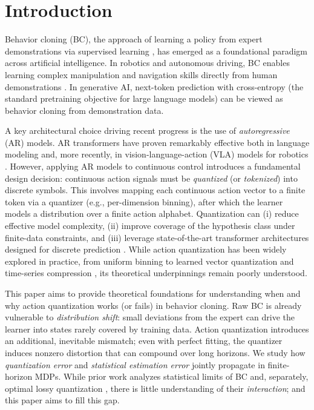 \documentclass{article}
\begin{document}
\section{Introduction}
Behavior cloning (BC), the approach of learning a policy from expert demonstrations via supervised learning \citep{pomerleau1988alvinn,bain1995framework}, has emerged as a foundational paradigm across artificial intelligence. In robotics and autonomous driving, BC enables learning complex manipulation and navigation skills directly from human demonstrations \citep{black2024pi_0}. In generative AI, next-token prediction with cross-entropy (the standard pretraining objective for large language models) can be viewed as behavior cloning from demonstration data.

A key architectural choice driving recent progress is the use of \emph{autoregressive} (AR) models. AR transformers have proven remarkably effective both in language modeling and, more recently, in vision-language-action (VLA) models for robotics \citep{brohan2022rt,chebotar2023q,kim2024openvla}. However, applying AR models to continuous control introduces a fundamental design decision: continuous action signals must be \emph{quantized} (or \emph{tokenized}) into discrete symbols. This involves mapping each continuous action vector to a finite token via a quantizer (e.g., per-dimension binning), after which the learner models a distribution over a finite action alphabet. Quantization can (i) reduce effective model complexity, (ii) improve coverage of the hypothesis class under finite-data constraints, and (iii) leverage state-of-the-art transformer architectures designed for discrete prediction \citep{driess2025knowledge}. While action quantization has been widely explored in practice, from uniform binning \citep{brohan2022rt,brohan2024rt} to learned vector quantization \citep{lee2024behavior,belkhale2024minivla} and time-series compression \citep{pertsch2025fast}, its theoretical underpinnings remain poorly understood.

This paper aims to provide theoretical foundations for understanding when and why action quantization works (or fails) in behavior cloning. Raw BC is already vulnerable to \emph{distribution shift}: small deviations from the expert can drive the learner into states rarely covered by training data. Action quantization introduces an additional, inevitable mismatch; even with perfect fitting, the quantizer induces nonzero distortion that can compound over long horizons. We study how \emph{quantization error} and \emph{statistical estimation error} jointly propagate in finite-horizon MDPs. While prior work analyzes statistical limits of BC \citep[e.g.,][]{ross2010efficient,ross2011reduction, rajaraman2020toward, foster2024behavior} and, separately, optimal lossy quantization \citep[e.g.,][]{widrow1996statistical, ordentlich2025optimal}, there is little understanding of their \emph{interaction}; and this paper aims to fill this gap.
\end{document}
